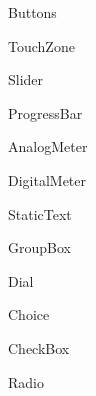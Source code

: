 Buttons\par
  Touch\-Zone\par
 Slider\par
 Progress\-Bar\par
 Analog\-Meter\par
 Digital\-Meter\par
 Static\-Text\par
 Group\-Box\par
 Dial\par
 Choice\par
 Check\-Box\par
 Radio\par
 